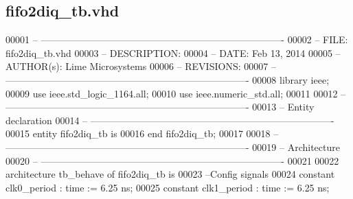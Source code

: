 \subsection{fifo2diq\+\_\+tb.\+vhd}
\label{fifo2diq__tb_8vhd_source}

\begin{DoxyCode}
00001 \textcolor{keyword}{-- ---------------------------------------------------------------------------- }
00002 \textcolor{keyword}{-- FILE:    fifo2diq\_tb.vhd}
00003 \textcolor{keyword}{-- DESCRIPTION: }
00004 \textcolor{keyword}{-- DATE:    Feb 13, 2014}
00005 \textcolor{keyword}{-- AUTHOR(s):   Lime Microsystems}
00006 \textcolor{keyword}{-- REVISIONS:}
00007 \textcolor{keyword}{-- ---------------------------------------------------------------------------- }
00008 \textcolor{vhdlkeyword}{library }\textcolor{keywordflow}{ieee};
00009 \textcolor{vhdlkeyword}{use }ieee.std\_logic\_1164.\textcolor{keywordflow}{all};
00010 \textcolor{vhdlkeyword}{use }ieee.numeric\_std.\textcolor{keywordflow}{all};
00011 
00012 \textcolor{keyword}{-- ----------------------------------------------------------------------------}
00013 \textcolor{keyword}{-- Entity declaration}
00014 \textcolor{keyword}{-- ----------------------------------------------------------------------------}
00015 \textcolor{keywordflow}{entity }fifo2diq_tb \textcolor{keywordflow}{is}
00016 \textcolor{keywordflow}{end} \textcolor{vhdlchar}{fifo2diq\_tb};
00017 
00018 \textcolor{keyword}{-- ----------------------------------------------------------------------------}
00019 \textcolor{keyword}{-- Architecture}
00020 \textcolor{keyword}{-- ----------------------------------------------------------------------------}
00021 
00022 \textcolor{keywordflow}{architecture} tb\_behave \textcolor{keywordflow}{of} fifo2diq_tb is
00023 \textcolor{keyword}{   --Config signals}
00024    \textcolor{keywordflow}{constant} \textcolor{vhdlchar}{clk0_period}    \textcolor{vhdlchar}{:} \textcolor{comment}{time} \textcolor{vhdlchar}{:=} \textcolor{vhdllogic}{}\textcolor{vhdllogic}{6}.\textcolor{vhdllogic}{25} \textcolor{vhdlchar}{ns};
00025    \textcolor{keywordflow}{constant} \textcolor{vhdlchar}{clk1_period}    \textcolor{vhdlchar}{:} \textcolor{comment}{time} \textcolor{vhdlchar}{:=} \textcolor{vhdllogic}{}\textcolor{vhdllogic}{6}.\textcolor{vhdllogic}{25} \textcolor{vhdlchar}{ns}; 

\end{DoxyCode}
